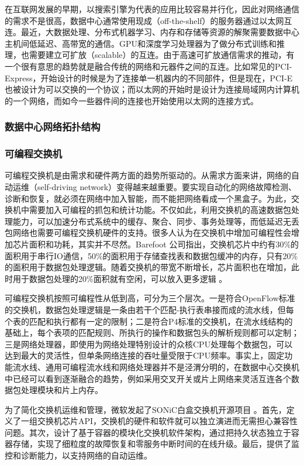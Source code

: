 在互联网发展的早期，以搜索引擎为代表的应用比较容易并行化，因此对网络通信的需求不是很高，数据中心通常使用现成（off-the-shelf）的服务器通过以太网互连。最近，大数据处理、分布式机器学习、内存和存储等资源的解聚需要数据中心主机间低延迟、高带宽的通信。GPU和深度学习处理器为了做分布式训练和推理，也需要建立可扩放（scalable）的互连。由于高速可扩放通信需求的推动，有一个很有意思的趋势就是融合传统的网络和元器件之间的互连。比如常见的PCI-Express，开始设计的时候是为了连接单一机器内的不同部件，但是现在，PCI-E也被设计为可以交换的一个协议；而以太网的开始时是设计为连接局域网内计算机的一个网络，而如今一些器件间的连接也开始使用以太网的连接方式。

\subsubsection{数据中心网络拓扑结构}



\subsubsection{可编程交换机}

可编程交换机是由需求和硬件两方面的趋势所驱动的。从需求方面来讲，网络的自动运维（self-driving network）变得越来越重要。要实现自动化的网络故障检测、诊断和恢复，就必须在网络中加入智能，而不能把网络看成一个黑盒子。为此，交换机中需要加入可编程的抓包和统计功能。不仅如此，利用交换机的高速数据包处理能力，可以加速分布式系统中的缓存、聚合、同步、事务处理等，而低延迟无丢包网络也需要可编程交换机硬件的支持。很多人认为在交换机中增加可编程性会增加芯片面积和功耗，其实并不尽然。Barefoot 公司指出，交换机芯片中约有30\%的面积用于串行IO通信，50\%的面积用于存储查找表和数据包缓冲的内存，只有20\%的面积用于数据包处理逻辑。随着交换机的带宽不断增长，芯片面积也在增加，此时用于数据包处理的20\%面积就有空闲，可以放入更多逻辑 \cite{barefoot-programmable}。

可编程交换机按照可编程性从低到高，可分为三个层次。一是符合OpenFlow标准的交换机，数据包处理逻辑是一条由若干个匹配-执行表串接而成的流水线，但每个表的匹配和执行都有一定的限制；二是符合P4标准的交换机，在流水线结构的基础上，每个表项的匹配规则、所执行的操作和数据包头的解析规则都可以定制；三是网络处理器，即使用为网络处理特别设计的众核CPU处理每个数据包，可以达到最大的灵活性，但单条网络连接的吞吐量受限于CPU频率。事实上，固定功能流水线、通用可编程流水线和网络处理器并不是泾渭分明的，在数据中心交换机中已经可以看到逐渐融合的趋势，例如采用交叉开关或片上网络来灵活互连各个数据包处理模块和片上内存。

为了简化交换机运维和管理，微软发起了SONiC白盒交换机开源项目 \cite{sonic}。首先，定义了一组交换机芯片API，交换机的硬件和软件就可以独立演进而无需担心兼容性问题。其次，设计了基于容器的模块化交换机软件架构，通过把持久状态独立于容器存储，实现了细粒度的故障恢复和零服务中断时间的在线升级。最后，提供了监控和诊断能力，以支持网络的自动运维。

